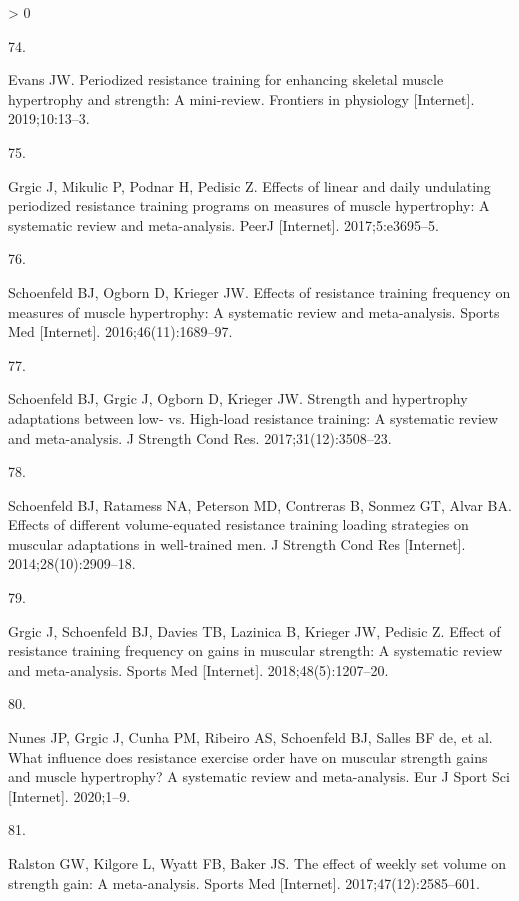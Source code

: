 \documentclass[twoside,10pt]{gihclass} %
\newlength{\cslhangindent}
\newlength{\csllabelwidth}
\newenvironment{CSLReferences}[3] %
 {%
  \setlength{\parindent}{0pt}
  \ifodd #1 \everypar{\setlength{\hangindent}{\cslhangindent}}\ignorespaces\fi
  \ifnum #2 > 0
  \setlength{\parskip}{#2\baselineskip}
  \fi
 }%
 {}
\newcommand{\CSLLeftMargin}[1]{\parbox[t]{\maxof{\widthof{#1}}{\csllabelwidth}}{#1}}
\newcommand{\CSLRightInline}[1]{\parbox[t]{\linewidth}{#1}}
\begin{document}
\begin{CSLReferences}{0}{0}
\leavevmode\hypertarget{ref-RN2575}{}%
\CSLLeftMargin{74. }
\CSLRightInline{Evans JW. Periodized resistance training for enhancing skeletal muscle hypertrophy and strength: A mini-review. Frontiers in physiology {[}Internet{]}. 2019;10:13--3. }

\leavevmode\hypertarget{ref-RN2572}{}%
\CSLLeftMargin{75. }
\CSLRightInline{Grgic J, Mikulic P, Podnar H, Pedisic Z. Effects of linear and daily undulating periodized resistance training programs on measures of muscle hypertrophy: A systematic review and meta-analysis. PeerJ {[}Internet{]}. 2017;5:e3695--5. }

\leavevmode\hypertarget{ref-RN2571}{}%
\CSLLeftMargin{76. }
\CSLRightInline{Schoenfeld BJ, Ogborn D, Krieger JW. Effects of resistance training frequency on measures of muscle hypertrophy: A systematic review and meta-analysis. Sports Med {[}Internet{]}. 2016;46(11):1689--97. }

\leavevmode\hypertarget{ref-RN2569}{}%
\CSLLeftMargin{77. }
\CSLRightInline{Schoenfeld BJ, Grgic J, Ogborn D, Krieger JW. Strength and hypertrophy adaptations between low- vs. High-load resistance training: A systematic review and meta-analysis. J Strength Cond Res. 2017;31(12):3508--23. }

\leavevmode\hypertarget{ref-RN1612}{}%
\CSLLeftMargin{78. }
\CSLRightInline{Schoenfeld BJ, Ratamess NA, Peterson MD, Contreras B, Sonmez GT, Alvar BA. Effects of different volume-equated resistance training loading strategies on muscular adaptations in well-trained men. J Strength Cond Res {[}Internet{]}. 2014;28(10):2909--18. }

\leavevmode\hypertarget{ref-RN2570}{}%
\CSLLeftMargin{79. }
\CSLRightInline{Grgic J, Schoenfeld BJ, Davies TB, Lazinica B, Krieger JW, Pedisic Z. Effect of resistance training frequency on gains in muscular strength: A systematic review and meta-analysis. Sports Med {[}Internet{]}. 2018;48(5):1207--20. }

\leavevmode\hypertarget{ref-RN2591}{}%
\CSLLeftMargin{80. }
\CSLRightInline{Nunes JP, Grgic J, Cunha PM, Ribeiro AS, Schoenfeld BJ, Salles BF de, et al. What influence does resistance exercise order have on muscular strength gains and muscle hypertrophy? A systematic review and meta-analysis. Eur J Sport Sci {[}Internet{]}. 2020;1--9. }

\leavevmode\hypertarget{ref-RN2492}{}%
\CSLLeftMargin{81. }
\CSLRightInline{Ralston GW, Kilgore L, Wyatt FB, Baker JS. The effect of weekly set volume on strength gain: A meta-analysis. Sports Med {[}Internet{]}. 2017;47(12):2585--601. }


\end{CSLReferences}
\end{document}
